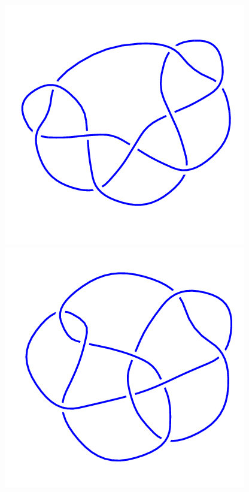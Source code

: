 \begin{figure}[H]
    \begin{minipage}[b]{.18\linewidth}
        \centering
        \includegraphics[width=\linewidth]{../data/9_31.png}
    \end{minipage}
    \begin{minipage}[b]{.18\linewidth}
        \centering
        \includegraphics[width=\linewidth]{../data/9_32.png}

\end{minipage}
\end{figure}
